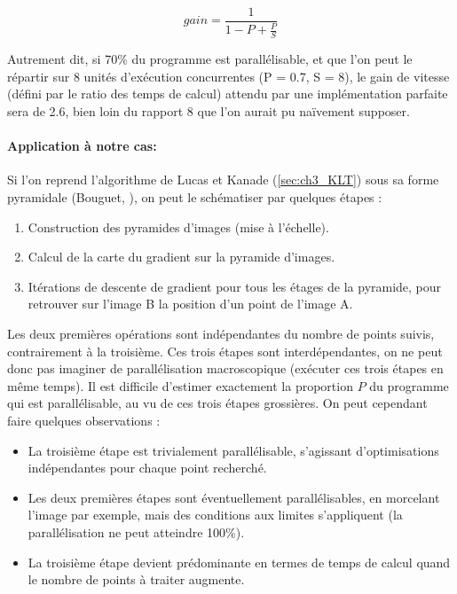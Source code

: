 \begin{equation} \label{eq:ch3_Amdahl}
	gain = \frac{1}{1 - P + \frac{P}{S}}
\end{equation}

Autrement dit, si 70\% du programme est parallélisable, et que l'on peut le répartir sur 8 unités d'exécution concurrentes (P = 0.7, S = 8), le gain de vitesse (défini par le ratio des temps de calcul) attendu par une implémentation parfaite sera de 2.6, bien loin du rapport 8 que l'on aurait pu naïvement supposer.\\

\paragraph{Application à notre cas:\\}
Si l'on reprend l'algorithme de Lucas et Kanade (\ref{sec:ch3_KLT}) sous sa forme pyramidale (Bouguet, \cite{Bouguet2001a}), on peut le schématiser par quelques étapes :
\begin{enumerate}
	\item Construction des pyramides d'images (mise à l'échelle).
	\item Calcul de la carte du gradient sur la pyramide d'images. 
	\item Itérations de \og descente de gradient\fg{} pour tous les étages de la pyramide, pour retrouver sur l'image B la position d'un point de l'image A.\\
\end{enumerate}

Les deux premières opérations sont indépendantes du nombre de points suivis, contrairement à la troisième. Ces trois étapes sont interdépendantes, on ne peut donc pas imaginer de parallélisation macroscopique (exécuter ces trois étapes en même temps). Il est difficile d'estimer exactement la proportion $P$ du programme qui est parallélisable, au vu de ces trois étapes grossières. On peut cependant faire quelques observations :

\begin{itemize}
	\item La troisième étape est trivialement parallélisable, s'agissant d'optimisations indépendantes pour chaque point recherché.
	\item Les deux premières étapes sont éventuellement parallélisables, en morcelant l'image par exemple, mais des conditions aux limites s'appliquent (la parallélisation ne peut atteindre 100\%).
	\item La troisième étape devient prédominante en termes de temps de calcul quand le nombre de points à traiter augmente.\\
\end{itemize}

